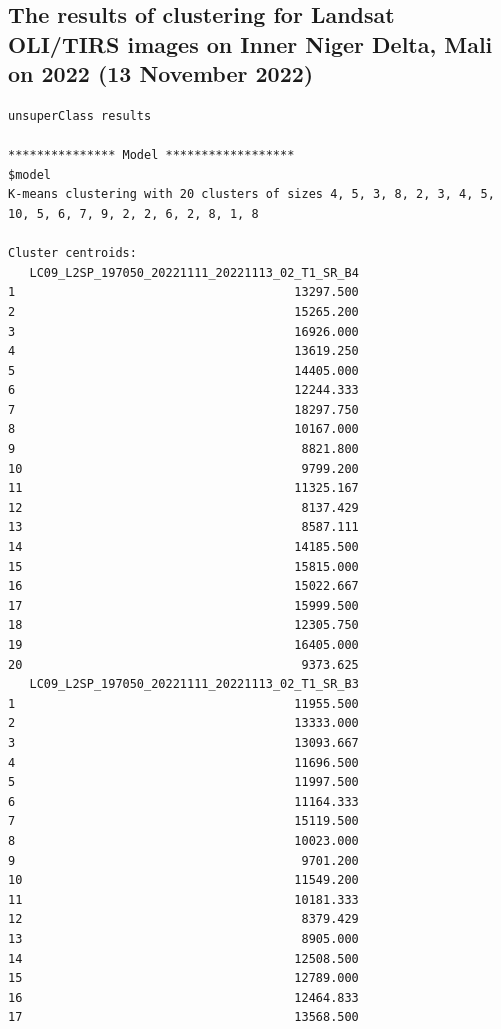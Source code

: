 \documentclass[12pt,a4paper,oneside]{article}
\begin{document}
\subsection*{The results of clustering for Landsat OLI/TIRS images on Inner Niger Delta, Mali on 2022 (13 November 2022)}
\begin{scriptsize}
\begin{verbatim}
unsuperClass results

*************** Model ******************
$model
K-means clustering with 20 clusters of sizes 4, 5, 3, 8, 2, 3, 4, 5, 10, 5, 6, 7, 9, 2, 2, 6, 2, 8, 1, 8

Cluster centroids:
   LC09_L2SP_197050_20221111_20221113_02_T1_SR_B4
1                                       13297.500
2                                       15265.200
3                                       16926.000
4                                       13619.250
5                                       14405.000
6                                       12244.333
7                                       18297.750
8                                       10167.000
9                                        8821.800
10                                       9799.200
11                                      11325.167
12                                       8137.429
13                                       8587.111
14                                      14185.500
15                                      15815.000
16                                      15022.667
17                                      15999.500
18                                      12305.750
19                                      16405.000
20                                       9373.625
   LC09_L2SP_197050_20221111_20221113_02_T1_SR_B3
1                                       11955.500
2                                       13333.000
3                                       13093.667
4                                       11696.500
5                                       11997.500
6                                       11164.333
7                                       15119.500
8                                       10023.000
9                                        9701.200
10                                      11549.200
11                                      10181.333
12                                       8379.429
13                                       8905.000
14                                      12508.500
15                                      12789.000
16                                      12464.833
17                                      13568.500

\end{verbatim}
\end{scriptsize}
\end{document}

